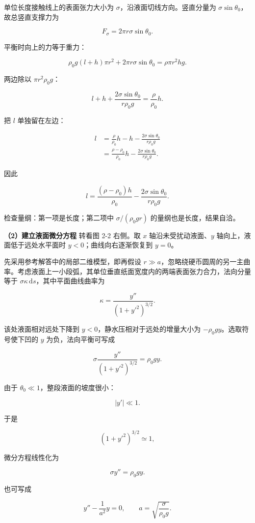 \documentclass[12pt,a4paper,UTF8]{ctexart}
\begin{document}
单位长度接触线上的表面张力大小为 \(\sigma\)，沿液面切线方向。竖直分量为
\(\sigma\sin\theta_0\)，故总竖直支撑力为

\[F_\sigma=2\pi r\sigma\sin\theta_0.\]

平衡时向上的力等于重力：

\[
\rho_0g(l+h)\pi r^2
+2\pi r\sigma\sin\theta_0
=\rho\pi r^2hg.
\]

两边除以 \(\pi r^2\rho_0g\)：

\[
l+h+\frac{2\sigma\sin\theta_0}{r\rho_0g}
=\frac{\rho}{\rho_0}h.
\]

把 \(l\) 单独留在左边：

\[
\begin{aligned}
l
&=\frac{\rho}{\rho_0}h-h
-\frac{2\sigma\sin\theta_0}{r\rho_0g}\\
&=\frac{\rho-\rho_0}{\rho_0}h
-\frac{2\sigma\sin\theta_0}{r\rho_0g}.
\end{aligned}
\]

因此

\[
\boxed{
l=\frac{(\rho-\rho_0)h}{\rho_0}
-\frac{2\sigma\sin\theta_0}{r\rho_0g}
}.
\]

检查量纲：第一项是长度；第二项中 \(\sigma/(\rho_0gr)\)
的量纲也是长度，结果自洽。

\textbf{（2）建立液面微分方程} 转看图 2-2 右侧。取 \(x\)
轴沿未受扰动液面、\(y\) 轴向上，液面低于远处水平面时
\(y<0\)；曲线向右逐渐恢复到 \(y=0\)。

先采用参考解答中的局部二维模型，即再假设
\(r\gg a\)，忽略绕硬币圆周的另一主曲率。考虑液面上一小段弧，其单位垂直纸面宽度内的两端表面张力合力，法向分量等于
\(\sigma\kappa\,\mathrm{d}s\)，其中平面曲线曲率为

\[
\kappa=\frac{y''}{(1+y'^2)^{3/2}}.
\]

该处液面相对远处下降到 \(y<0\)，静水压相对于远处的增量大小为
\(-\rho_0gy\)。选取符号使下凹的 \(y\) 为负，法向平衡可写成

\[
\sigma\frac{y''}{(1+y'^2)^{3/2}}=\rho_0gy.
\]

由于 \(\theta_0\ll1\)，整段液面的坡度很小：

\[|y'|\ll1.\]

于是

\[
(1+y'^2)^{3/2}\simeq1,
\]

微分方程线性化为

\[
\boxed{\sigma y''=\rho_0gy}.
\]

也可写成

\[
\boxed{y''-\frac{1}{a^2}y=0},
\qquad
a=\sqrt{\frac{\sigma}{\rho_0g}}.
\]
\end{document}
